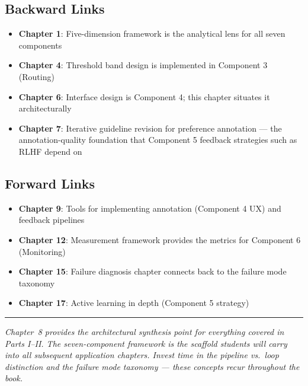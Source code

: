 \subsection{Backward Links}
\begin{itemize}
    \item \textbf{Chapter 1}: Five-dimension framework is the analytical lens for all seven components
    \item \textbf{Chapter 4}: Threshold band design is implemented in Component 3 (Routing)
    \item \textbf{Chapter 6}: Interface design is Component 4; this chapter situates it architecturally
    \item \textbf{Chapter 7}: Iterative guideline revision for preference annotation --- the annotation-quality foundation that Component 5 feedback strategies such as RLHF depend on
\end{itemize}

\subsection{Forward Links}
\begin{itemize}
    \item \textbf{Chapter 9}: Tools for implementing annotation (Component 4 UX) and feedback pipelines
    \item \textbf{Chapter 12}: Measurement framework provides the metrics for Component 6 (Monitoring)
    \item \textbf{Chapter 15}: Failure diagnosis chapter connects back to the failure mode taxonomy
    \item \textbf{Chapter 17}: Active learning in depth (Component 5 strategy)
\end{itemize}

\bigskip
\begin{center}
\rule{0.5\textwidth}{0.4pt}
\end{center}
\bigskip

\noindent\textit{Chapter~8 provides the architectural synthesis point for everything covered in Parts I--II. The seven-component framework is the scaffold students will carry into all subsequent application chapters. Invest time in the pipeline vs.\ loop distinction and the failure mode taxonomy --- these concepts recur throughout the book.}
